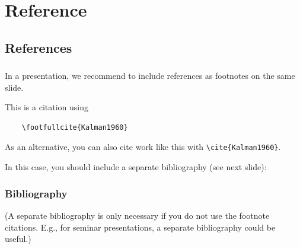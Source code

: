 \documentclass[numberofslides]{AMSBeamer}
\begin{document}
%
%

\section{Reference}
\sectionslide{\insertsection}

\subsection{References}


\begin{frame}[fragile,label=slidereferences]
	\frametitle{\insertsubsectionhead}%


	In a presentation, we recommend to include references as footnotes on the same slide.

	\bigskip%
	This is a citation using 
	\begin{verbatim}
	\footfullcite{Kalman1960}
	\end{verbatim}

	\bigskip

	As an alternative, you can also cite work like this \cite{Kalman1960} with
	\verb|\cite{Kalman1960}|.

	\smallskip
	In this case, you should include a separate bibliography (see next slide):
	\bibcode

\end{frame}

\begin{frame}%
	\frametitle{Bibliography}
	\printbibliography

	\bigskip
	(A separate bibliography is only necessary if you do not use the footnote citations. E.g., for seminar presentations, a separate bibliography could be useful.)
\end{frame}

%
%
\end{document}
